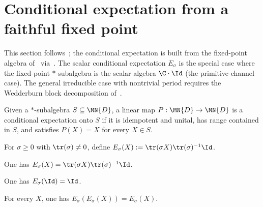\section{Conditional expectation from a faithful fixed point}

This section follows~\cite[Section~6.4]{Wolf2012Quantum}; the conditional
expectation is built from the fixed-point algebra
of~\cite[Theorem~6.14]{Wolf2012Quantum}
via~\cite[(1.40)]{Wolf2012Quantum}.
The scalar conditional expectation $E_\sigma$ is the special case where
the fixed-point $*$-subalgebra is the scalar algebra $\C\cdot\Id$
(the primitive-channel case). The general irreducible case with
nontrivial period requires the Wedderburn block decomposition
of~\cite[Theorem~6.14]{Wolf2012Quantum}.

\begin{definition}\label{def:is_conditional_expectation}
    \leanok
    Given a $*$-subalgebra $S\subseteq\MN{D}$, a linear map
    $P:\MN{D}\to\MN{D}$ is a conditional expectation onto $S$ if it is
    idempotent and unital, has range contained in $S$, and satisfies
    $P(X)=X$ for every $X\in S$.
\end{definition}

\begin{definition}\label{def:scalar_conditional_expectation}
    \leanok
    For $\sigma\geq0$ with $\tr(\sigma)\neq0$, define
    $E_\sigma(X):=\tr(\sigma X)\tr(\sigma)^{-1}\Id$.
\end{definition}

\begin{lemma}\label{lem:scalar_conditional_expectation_apply}
    \leanok
    One has $E_\sigma(X)=\tr(\sigma X)\tr(\sigma)^{-1}\Id$.
\end{lemma}

\begin{lemma}[Unitality]\label{thm:scalar_conditional_expectation_unital}
    \leanok
    One has $E_\sigma(\Id)=\Id$.
\end{lemma}

\begin{lemma}[Idempotence]\label{thm:scalar_conditional_expectation_idempotent}
    \leanok
    For every $X$, one has $E_\sigma(E_\sigma(X))=E_\sigma(X)$.
\end{lemma}

